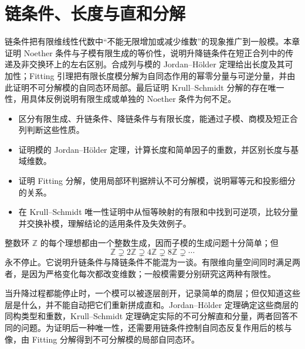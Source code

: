
\chapter{链条件、长度与直和分解}
\label{b2:ch:12}

\begin{chapterabstract}
	链条件把有限维线性代数中“不能无限增加或减少维数”的现象推广到一般模。本章证明 Noether 条件与子模有限生成的等价性，说明升降链条件在短正合列中的传递及非交换环上的左右区别。合成列与模的 Jordan–Hölder 定理给出长度及其可加性；Fitting 引理把有限长度模分解为自同态作用的幂零分量与可逆分量，并由此证明不可分解模的自同态环局部。最后证明 Krull–Schmidt 分解的存在唯一性，用具体反例说明有限生成或单独的 Noether 条件为何不足。
\end{chapterabstract}

\begin{learninggoals}
	\begin{itemize}
		\item 区分有限生成、升链条件、降链条件与有限长度，能通过子模、商模及短正合列判断这些性质。
		\item 证明模的 Jordan–Hölder 定理，计算长度和简单因子的重数，并区别长度与基域维数。
		\item 证明 Fitting 分解，使用局部环判据辨认不可分解模，说明幂等元和投影细分的关系。
		\item 在 Krull–Schmidt 唯一性证明中从恒等映射的有限和中找到可逆项，比较分量并交换补模，理解结论的适用条件及失效例子。
	\end{itemize}
\end{learninggoals}

整数环 \(\mathbb Z\) 的每个理想都由一个整数生成，因而子模的生成问题十分简单；但
\[
	\mathbb Z\supsetneq2\mathbb Z\supsetneq4\mathbb Z\supsetneq8\mathbb Z\supsetneq\cdots
\]
永不停止。它说明升链条件与降链条件不能混为一谈。有限维向量空间同时满足两者，是因为严格变化每次都改变维数；一般模需要分别研究这两种有限性。

\ProseParagraphBreak

当升降过程都能停止时，一个模可以被逐层剖开，记录简单的商层；但仅知道这些层是什么，并不能自动把它们重新拼成直和。Jordan–Hölder 定理确定这些商层的同构类型和重数，Krull–Schmidt 定理确定实际的不可分解直和分量，两者回答不同的问题。为证明后一种唯一性，还需要用链条件控制自同态反复作用后的核与像，由 Fitting 分解得到不可分解模的局部自同态环。


